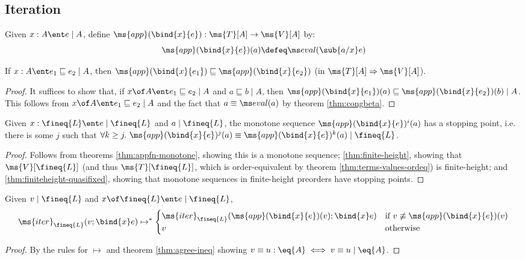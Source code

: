 \documentclass{article}
\newcommand{\ale}{\sqsubseteq}
\newcommand{\expope}[2]{#1 \Rightarrow #2}
\newcommand{\iter}[4]{\ms{iter}_{#1}({#2}; \bind{#3}#4)}
\newcommand{\step}{\mapsto}
\newcommand{\steps}{\step^*}
\newcommand{\lr}[2]{#2\mathrel{|}#1}
\newcommand{\lrcx}[3]{#1 \ent \lr{#2}{#3}}
\newcommand{\lrof}[1]{\ms{T}[#1]}
\newcommand{\Val}[1]{\ms{V}[#1]}
\begin{document}

\subsection{Iteration}

\newcommand{\appfn}[2]{\ms{app}(\bind{#1}{#2})}
\newcommand{\nthapp}[4]{\appfn{#1}{#2}^{#3}(#4)}

\begin{definition}
  Given $\lrcx{x:A}{A}{e}$, define $\appfn{x}{e} : \lrof{A} \to \Val{A}$
  by: \[\appfn{x}{e}(a) \defeq \evalfn(\sub{a/x} e)\]
\end{definition}

\begin{theorem}\label{thm:appfn-monotone}
  If $\lrcx{x:A}{A}{e_1 \ale e_2}$, then $\appfn{x}{e_1} \ale \appfn{x}{e_2}$
  (in $\expope{\lrof{A}}{\Val{A}}$).
\end{theorem}

\begin{proof}

  It suffices to show that, if $\lrcx{x\of A}{A}{e_1 \ale e_2}$ and $\lr{A}{a
    \ale b}$, then $\lr{A}{\appfn{x}{e_1}(a) \ale \appfn{x}{e_2}(b)}$. This
  follows from $\lrcx{x\of A}{A}{e_1 \ale e_2}$ and the fact that $a \equiv
  \evalfn(a)$ by theorem \ref{thm:congbeta}.
\end{proof}

\begin{corollary}\label{cor:fineq-stops}
  Given $\lrcx{x:\fineq{L}}{\fineq{L}}{e}$ and $\lr{\fineq{L}}{a}$, the monotone
  sequence $\nthapp{x}{e}{i}{a}$ has a stopping point, i.e. there is some $j$
  such that $\forall k \ge j.\ \lr{\fineq{L}}{\nthapp{x}{e}{j}{a} \equiv
    \nthapp{x}{e}{k}{a}}$.
\end{corollary}
\begin{proof}
  Follows from theorems \ref{thm:appfn-monotone}, showing this is a monotone
  sequence; \ref{thm:finite-height}, showing that $\Val{\fineq{L}}$ (and thus
  $\lrof{\fineq{L}}$, which is order-equivalent by theorem
  \ref{thm:terms-values-ordeq}) is finite-height; and
  \ref{thm:finiteheight-quasifixed}, showing that monotone sequences in
  finite-height preorders have stopping points.
\end{proof}

\begin{lemma}\label{lem:iter-onestep}
  Given $\lr{\fineq{L}}{v}$ and $\lrcx{x\of\fineq{L}}{\fineq{L}}{e}$,
  \[
  \iter{\fineq{L}}{v}{x}{e} \steps
  \begin{cases}
    \iter{\fineq{L}}{\appfn{x}{e}(v)}{x}{e}
    & \text{if}~v \not\equiv \appfn{x}{e}(v)\\
    v & \text{otherwise}
  \end{cases}
  \]
\end{lemma}
\begin{proof}
  By the rules for $\step$ and theorem \ref{thm:agree-ineq} showing $v \equiv u
  : \eq{A} \iff \lr{\eq{A}}{v \equiv u}$.
\end{proof}
\end{document}

